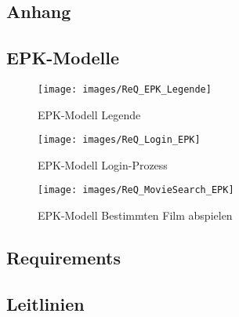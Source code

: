 \begin{appendix}
  \section{Anhang}\label{sec:anhang}

  \subsection{EPK-Modelle}\label{subsec:epk-modelle}

  \begin{figure}[H]
        \centering
        \texttt{[image: images/ReQ\_EPK\_Legende]}
        \caption{EPK-Modell Legende}
        \label{fig:epk_legende}
    \end{figure}

    \begin{figure}[H]
        \centering
        \texttt{[image: images/ReQ\_Login\_EPK]}
        \caption{EPK-Modell Login-Prozess}
        \label{fig:epk_login}
    \end{figure}

    \begin{figure}[H]
        \centering
        \texttt{[image: images/ReQ\_MovieSearch\_EPK]}
        \caption{EPK-Modell Bestimmten Film abspielen}
        \label{fig:epk_search}
    \end{figure}

    \subsection{Requirements}\label{subsec:requirements_catalouge}
    

    \subsection{Leitlinien}\label{subsec:leitlinien}
    
\end{appendix}